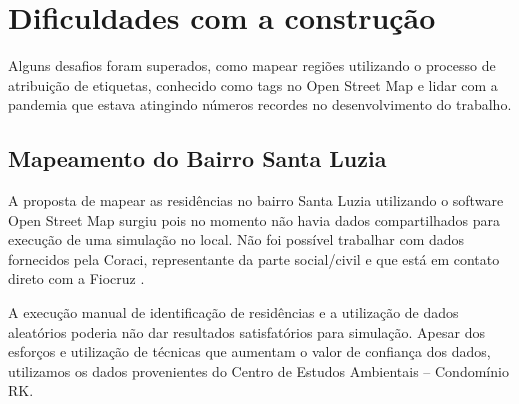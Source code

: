 \section{Dificuldades com a construção}

Alguns desafios foram superados, como mapear regiões utilizando o processo de atribuição de etiquetas, conhecido como tags no Open Street Map e lidar com a pandemia que estava atingindo números recordes no desenvolvimento do trabalho. 

\subsection{Mapeamento do Bairro Santa Luzia}

A proposta de mapear as residências no bairro Santa Luzia utilizando o software Open Street Map surgiu pois no momento não havia dados compartilhados para execução de uma simulação no local. Não foi possível trabalhar com dados fornecidos pela Coraci, representante da parte social/civil e que está em contato direto com a Fiocruz \cite{silva2020estudo}.

A execução manual de identificação de residências e a utilização de dados aleatórios poderia não dar resultados satisfatórios para simulação. Apesar dos esforços e utilização de técnicas que aumentam o valor de confiança dos dados, utilizamos os dados provenientes do Centro de Estudos Ambientais – Condomínio RK.
